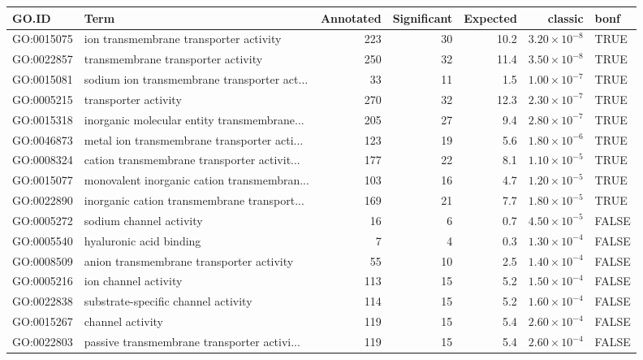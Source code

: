\begin{table}[ht]
\centering
\begin{adjustbox}{max width=\textwidth}
\begin{tabular}{llrrrrl}
  \hline
GO.ID & Term & Annotated & Significant & Expected & classic & bonf \\ 
  \hline
GO:0015075 & ion transmembrane transporter activity & 223 & 30 & 10.2 & $3.20 \times 10^{-8}$ & TRUE \\ 
  GO:0022857 & transmembrane transporter activity & 250 & 32 & 11.4 & $3.50 \times 10^{-8}$ & TRUE \\ 
  GO:0015081 & sodium ion transmembrane transporter act... & 33 & 11 & 1.5 & $1.00 \times 10^{-7}$ & TRUE \\ 
  GO:0005215 & transporter activity & 270 & 32 & 12.3 & $2.30 \times 10^{-7}$ & TRUE \\ 
  GO:0015318 & inorganic molecular entity transmembrane... & 205 & 27 & 9.4 & $2.80 \times 10^{-7}$ & TRUE \\ 
  GO:0046873 & metal ion transmembrane transporter acti... & 123 & 19 & 5.6 & $1.80 \times 10^{-6}$ & TRUE \\ 
  GO:0008324 & cation transmembrane transporter activit... & 177 & 22 & 8.1 & $1.10 \times 10^{-5}$ & TRUE \\ 
  GO:0015077 & monovalent inorganic cation transmembran... & 103 & 16 & 4.7 & $1.20 \times 10^{-5}$ & TRUE \\ 
  GO:0022890 & inorganic cation transmembrane transport... & 169 & 21 & 7.7 & $1.80 \times 10^{-5}$ & TRUE \\ 
  GO:0005272 & sodium channel activity & 16 & 6 & 0.7 & $4.50 \times 10^{-5}$ & FALSE \\ 
  GO:0005540 & hyaluronic acid binding & 7 & 4 & 0.3 & $1.30 \times 10^{-4}$ & FALSE \\ 
  GO:0008509 & anion transmembrane transporter activity & 55 & 10 & 2.5 & $1.40 \times 10^{-4}$ & FALSE \\ 
  GO:0005216 & ion channel activity & 113 & 15 & 5.2 & $1.50 \times 10^{-4}$ & FALSE \\ 
  GO:0022838 & substrate-specific channel activity & 114 & 15 & 5.2 & $1.60 \times 10^{-4}$ & FALSE \\ 
  GO:0015267 & channel activity & 119 & 15 & 5.4 & $2.60 \times 10^{-4}$ & FALSE \\ 
  GO:0022803 & passive transmembrane transporter activi... & 119 & 15 & 5.4 & $2.60 \times 10^{-4}$ & FALSE \\ 

\end{tabular}
\end{adjustbox}
\end{table}
